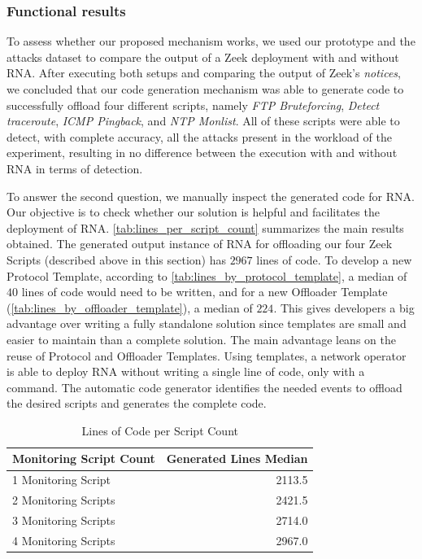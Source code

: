 \subsubsection*{Functional results}

To assess whether our proposed mechanism works, we used our prototype and the attacks dataset to compare the output of a Zeek deployment with and without RNA. After executing both setups and comparing the output of Zeek's \textit{notices}, we concluded that our code generation mechanism was able to generate code to successfully offload four different scripts, namely \textit{FTP Bruteforcing}, \textit{Detect traceroute}, \textit{ICMP Pingback}, and \textit{NTP Monlist}. All of these scripts were able to detect, with complete accuracy, all the attacks present in the workload of the experiment, resulting in no difference between the execution with and without RNA in terms of detection.

To answer the second question, we manually inspect the generated code for RNA. Our objective is to check whether our solution is helpful and facilitates the deployment of RNA. \autoref{tab:lines_per_script_count} summarizes the main results obtained. The generated output instance of RNA for offloading our four Zeek Scripts (described above in this section) has $2967$ lines of code. To develop a new Protocol Template, according to \autoref{tab:lines_by_protocol_template}, a median of $40$ lines of code would need to be written, and for a new Offloader Template (\autoref{tab:lines_by_offloader_template}), a median of $224$. This gives developers a big advantage over writing a fully standalone solution since templates are small and easier to maintain than a complete solution. The main advantage leans on the reuse of Protocol and Offloader Templates. Using templates, a network operator is able to deploy RNA without writing a single line of code, only with a command. The automatic code generator identifies the needed events to offload the desired scripts and generates the complete code.


\begin{table}[htb]
    \caption{Lines of Code per Script Count}
    \begin{center}
        \begin{tabular}{|l|r|}
            \hline
            \textbf{Monitoring Script Count} & \multicolumn{1}{l|}{\textbf{Generated Lines Median}} \\ \hline
            1 Monitoring Script              & 2113.5                                             \\ \hline
            2 Monitoring Scripts             & 2421.5                                             \\ \hline
            3 Monitoring Scripts             & 2714.0                                             \\ \hline
            4 Monitoring Scripts             & 2967.0                                             \\ \hline
        \end{tabular}%
    \end{center}
    \label{tab:lines_per_script_count}
\end{table}

